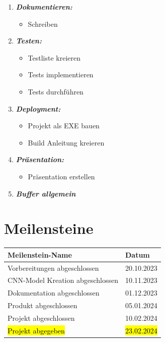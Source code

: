 \begin{enumerate}
\item \textbf{\emph{Dokumentieren:}}
\begin{itemize}
\item Schreiben
\end{itemize}

\item \textbf{\emph{Testen:}}
\begin{itemize}
\item Testliste kreieren
\item Tests implementieren
\item Tests durchführen
\end{itemize}

\item \textbf{\emph{Deployment:}}
\begin{itemize}
\item Projekt als EXE bauen
\item Build Anleitung kreieren
\end{itemize}

\item \textbf{\emph{Präsentation:}}
\begin{itemize}
\item Präsentation erstellen
\end{itemize}

\item \textbf{\emph{Buffer allgemein}}
\end{enumerate}

\section{Meilensteine}
\label{sec:PlanungMeilensteine}

\begin{xltabular}{\linewidth}{|X|X|}
\hline
Meilenstein-Name & Datum
\\\hline
Vorbereitungen abgeschlossen & 20.10.2023
\\\hline
CNN-Model Kreation abgeschlossen & 10.11.2023
\\\hline
Dokumentation abgeschlossen & 01.12.2023
\\\hline
Produkt abgeschlossen & 05.01.2024
\\\hline
Projekt abgeschlossen & 10.02.2024
\\\hline
\hl{Projekt abgegeben} & \hl{23.02.2024}
\\\hline
\end{xltabular}

